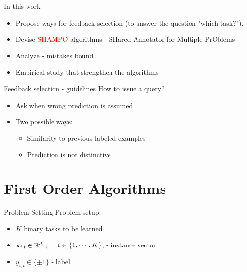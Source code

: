 \documentclass{beamer}
\begin{document}
\begin{frame}{In this work}
\begin{itemize}
\item Propose  ways for feedback selection (to answer the question "which task?").   \newline
\item Devise    \textcolor{red}{SHAMPO} algorithms  - SHared Annotator for Multiple PrOblems\newline
\item Analyze -  mistakes bound \newline
\item Empirical study that strengthen the algorithms\newline
\end{itemize}
\end{frame}


\begin{frame}{Feedback selection - guidelines}
How to issue a query?\newline
\begin{itemize}
\item Ask when  wrong prediction is assumed\newline
\item Two possible ways:\newline
\begin{itemize}
\item Similarity to previous  labeled  examples \newline
\item Prediction is not distinctive\end{itemize}
\end{itemize}
\end{frame}

\section{First Order Algorithms}

\begin{frame}{Problem Setting}
Problem setup:\newline
\begin{itemize}
\item $K$ binary tasks to be learned \newline
\item $\mathbf{x}_{i,t}\in \mathbb{R}^{d_i}$,~~~$i\in\left\{{1,\cdots,K}\right\}$, - instance vector\newline
\item $y_{i,t}\in\{\pm1\}$ - label\newline
\end{itemize}


\end{frame}
\end{document}
